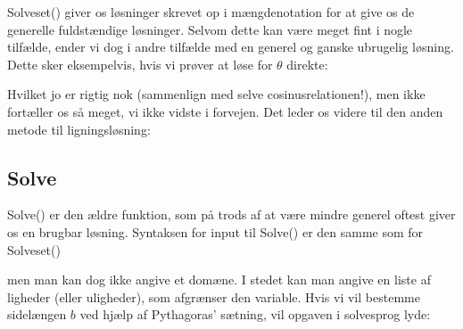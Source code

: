 \documentclass[letterpaper,10pt,english]{jupyterBook}
\begin{document}
\noindent{}

Solveset() giver os løsninger skrevet op i mængdenotation for at give os de generelle fuldstændige løsninger. Selvom dette kan være meget fint i nogle tilfælde, ender vi dog i andre tilfælde med en generel og ganske ubrugelig løsning. Dette sker eksempelvis, hvis vi prøver at løse for \(\theta\) direkte:

\begin{sphinxVerbatim}[commandchars=\\\{\}]
 
\end{sphinxVerbatim}

\noindent{}

Hvilket jo er rigtig nok (sammenlign med selve cosinusrelationen!), men ikke fortæller os så meget, vi ikke vidste i forvejen. Det leder os videre til den anden metode til ligningsløsning:


\subsection{Solve}
\label{\detokenize{notebooks/sympy/Notebook3_ligninger:solve}}
Solve() er den ældre funktion, som på trods af at være mindre generel oftest giver os en brugbar løsning. Syntaksen for input til Solve() er den samme som for Solveset()

\begin{sphinxVerbatim}[commandchars=\\\{\}]
 
\end{sphinxVerbatim}

\noindent{}

men man kan dog ikke angive et domæne. I stedet kan man angive en liste af ligheder (eller uligheder), som afgrænser den variable. Hvis vi vil bestemme sidelængen \(b\) ved hjælp af Pythagoras’ sætning, vil opgaven i solve\sphinxhyphen{}sprog lyde:

\begin{sphinxVerbatim}[commandchars=\\\{\}]
  \PYG{p}{[}   \PYG{p}{]} 
\end{sphinxVerbatim}
\end{document}
